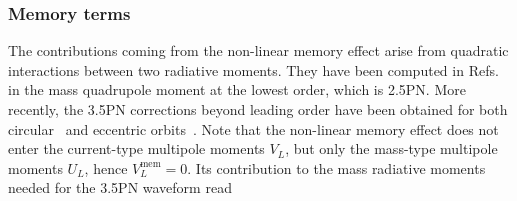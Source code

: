 \documentclass[prd,preprint,superscriptaddress,tightenlines,nofootinbib,
  eqsecnum,showpacs]{revtex4}
\begin{document}
\subsubsection{Memory terms}
\label{sec:mem}

The contributions coming from the non-linear memory effect arise from
quadratic interactions between two radiative moments. They have been
computed in Refs.~\cite{B90, Chr91, WW91, Th92, BD92, B98quad} in the
mass quadrupole moment at the lowest order, which is 2.5PN. More
recently, the 3.5PN corrections beyond leading order have been
obtained for both circular~\cite{F09} and eccentric
orbits~\cite{F11}. Note that the non-linear memory effect does not
enter the current-type multipole moments $V_L$, but only the mass-type
multipole moments $U_L$, hence $V_L^{\text{mem}}=0$. Its contribution
to the mass radiative moments needed for the 3.5PN waveform read
%
\end{document}

